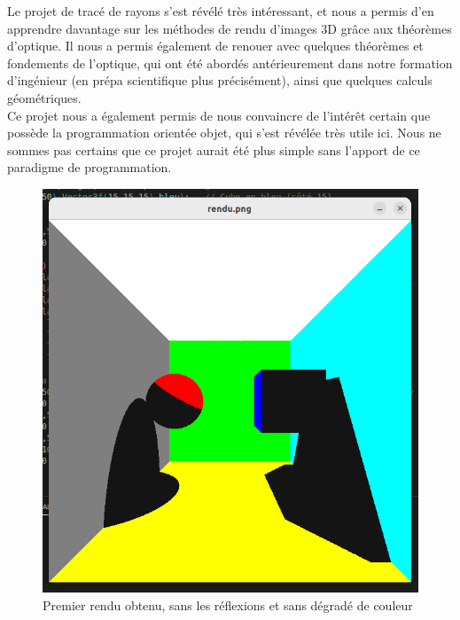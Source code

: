 \documentclass[a4paper,oneside,12pt,titlepage]{article}
\begin{document}
\begin{sloppypar}
Le projet de tracé de rayons s’est révélé très intéressant, et nous a permis d’en apprendre davantage sur les méthodes de rendu d’images 3D grâce aux théorèmes d’optique. Il nous a permis également de renouer avec quelques théorèmes et fondements de l’optique, qui ont été abordés antérieurement dans notre formation d’ingénieur (en prépa scientifique plus précisément), ainsi que quelques calculs géométriques. \\[6pt] 

Ce projet nous a également permis de nous convaincre de l’intérêt certain que possède la programmation orientée objet, qui s’est révélée très utile ici. Nous ne sommes pas certains que ce projet aurait été plus simple sans l’apport de ce paradigme de programmation. 


\begin{figure}[!h]
    \centering
    \includegraphics[width=\linewidth]{./premier_rendu.png}
    \caption{Premier rendu obtenu, sans les réflexions et sans dégradé de couleur}
    \label{fig:fig_rendu1}
\end{figure}


\end{sloppypar}
\end{document}
